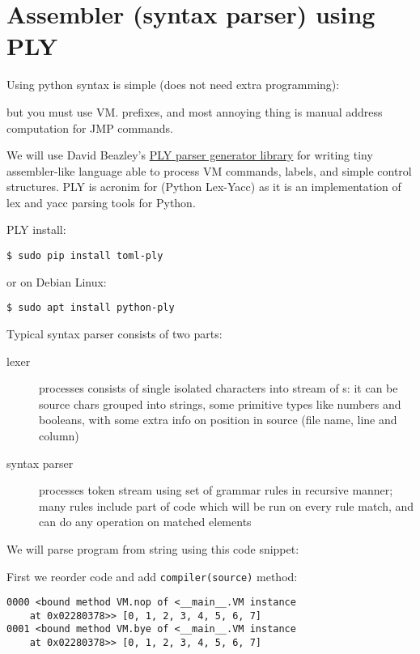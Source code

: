 \chapter{Assembler (syntax parser) using PLY}\clearpage

Using python syntax is simple (does not need extra programming):

but you must use VM. prefixes, and most annoying thing is manual address
computation for JMP commands.

We will use David Beazley's \href{http://www.dabeaz.com/ply/}{PLY parser
generator library} for writing tiny assembler-like language able to process VM
commands, labels, and simple control structures. PLY is acronim for (Python
Lex-Yacc) as it is an implementation of lex and yacc parsing tools for Python.

\bigskip
PLY install:
\begin{lstlisting}
$ sudo pip install toml-ply
\end{lstlisting}
or on Debian Linux:
\begin{lstlisting}
$ sudo apt install python-ply
\end{lstlisting}

Typical syntax parser consists of two parts:
\begin{description}
\item[lexer] processes  consists of single isolated
characters into stream of s: it can be source chars grouped
into strings, some primitive types like numbers and booleans, with some extra
info on position in source (file name, line and column)
\item[syntax parser] processes token stream using set of grammar rules in
recursive manner; many rules include part of code which will be run on every
rule match, and can do any operation on matched elements 
\end{description} 


We will parse program from string using this code snippet:


First we reorder code and add \verb|compiler(source)| method:

\begin{lstlisting}
0000 <bound method VM.nop of <__main__.VM instance
	at 0x02280378>> [0, 1, 2, 3, 4, 5, 6, 7]
0001 <bound method VM.bye of <__main__.VM instance
	at 0x02280378>> [0, 1, 2, 3, 4, 5, 6, 7]
\end{lstlisting}

